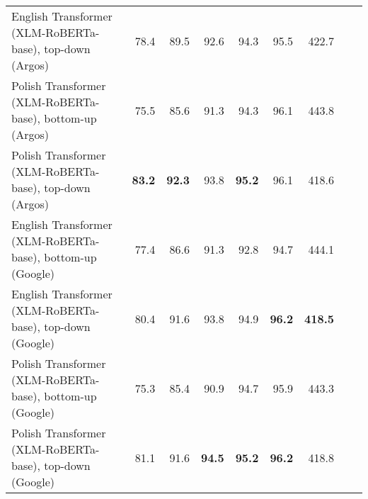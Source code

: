 \begin{table}[ht!]
{\begin{tabular}{lrrrrrrrr}
  English Transformer (XLM-RoBERTa-base), top-down (Argos) & 78.4 & 89.5 & 92.6 & 94.3 & 95.5 & 422.7 \\ 
  Polish Transformer (XLM-RoBERTa-base), bottom-up (Argos) & 75.5 & 85.6 & 91.3 & 94.3 & 96.1 & 443.8 \\ 
  Polish Transformer (XLM-RoBERTa-base), top-down (Argos) & \textbf{83.2} & \textbf{92.3} & 93.8 & \textbf{95.2} & 96.1 & 418.6 \\ 
  English Transformer (XLM-RoBERTa-base), bottom-up (Google) & 77.4 & 86.6 & 91.3 & 92.8 & 94.7 & 444.1 \\ 
  English Transformer (XLM-RoBERTa-base), top-down (Google) & 80.4 & 91.6 & 93.8 & 94.9 & \textbf{96.2} & \textbf{418.5} \\ 
  Polish Transformer (XLM-RoBERTa-base), bottom-up (Google) & 75.3 & 85.4 & 90.9 & 94.7 & 95.9 & 443.3 \\ 
  Polish Transformer (XLM-RoBERTa-base), top-down (Google) & 81.1 & 91.6 & \textbf{94.5} & \textbf{95.2} & \textbf{96.2} & 418.8 \\ 
   \hline
\end{tabular}
}
\end{table}




